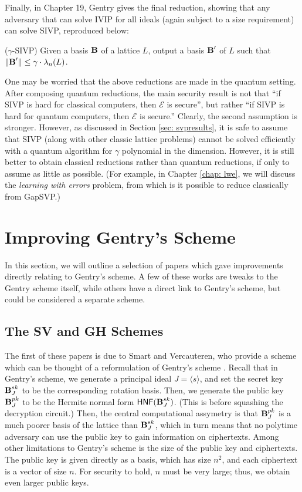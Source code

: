         Finally, in Chapter 19, Gentry gives the final reduction, showing that any adversary that can solve IVIP for all ideals (again subject to a size requirement) can solve SIVP, reproduced below:
        \begin{definition} ($\gamma$-SIVP)
            Given a basis $\textbf{B}$ of a lattice $L$, output a basis $\textbf{B}'$ of $L$ such that $\Vert \textbf{B}' \Vert \leq \gamma \cdot \lambda_n(L)$.
        \end{definition}

        One may be worried that the above reductions are made in the quantum setting. After composing quantum reductions, the main security result is not that ``if SIVP is hard for classical computers, then $\mathcal{E}$ is secure'', but rather ``if SIVP is hard for quantum computers, then $\mathcal{E}$ is secure.'' Clearly, the second assumption is stronger. However, as discussed in Section \ref{sec: svpresults}, it is safe to assume that SIVP (along with other classic lattice problems) cannot be solved efficiently with a quantum algorithm for $\gamma$ polynomial in the dimension. However, it is still better to obtain classical reductions rather than quantum reductions, if only to assume as little as possible. (For example, in Chapter \ref{chap: lwe}, we will discuss the \emph{learning with errors} problem, from which is it possible to reduce classically from GapSVP.)

\section{Improving Gentry's Scheme} \label{sec:improvinggentry}
    In this section, we will outline a selection of papers which gave improvements directly relating to Gentry's scheme. A few of these works are tweaks to the Gentry scheme itself, while others have a direct link to Gentry's scheme, but could be considered a separate scheme.

    \subsection{The SV and GH Schemes}
    The first of these papers is due to Smart and Vercauteren, who provide a scheme which can be thought of a reformulation of Gentry's scheme \cite{SV09}. Recall that in Gentry's scheme, we generate a principal ideal $J = \langle s \rangle$, and set the secret key $\textbf{B}_J^{sk}$ to be the corresponding rotation basis. Then, we generate the public key $\textbf{B}_J^{pk}$ to be the Hermite normal form ${\sf HNF}(\textbf{B}_J^{sk})$. (This is before squashing the decryption circuit.) Then, the central computational assymetry is that $\textbf{B}_J^{pk}$ is a much poorer basis of the lattice than $\textbf{B}_J^{sk}$, which in turn means that no polytime adversary can use the public key to gain information on ciphertexts. Among other limitations to Gentry's scheme is the size of the public key and ciphertexts. The public key is given directly as a basis, which has size $n^2$, and each ciphertext is a vector of size $n$. For security to hold, $n$ must be very large; thus, we obtain even larger public keys.

